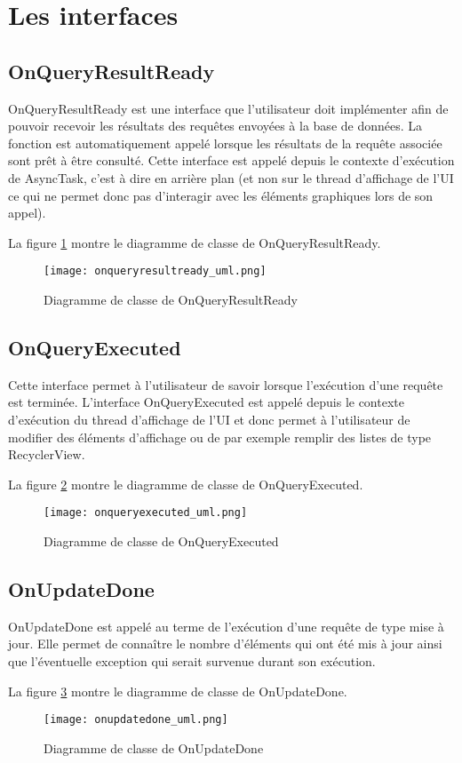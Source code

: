 \section{Les interfaces}

\subsection{OnQueryResultReady}

OnQueryResultReady est une interface que l'utilisateur doit implémenter afin de pouvoir recevoir les résultats des requêtes envoyées à la base de données. La fonction est automatiquement appelé lorsque les résultats de la requête associée sont prêt à être consulté. Cette interface est appelé depuis le contexte d'exécution de AsyncTask, c'est à dire en arrière plan (et non sur le thread d'affichage de l'UI ce qui ne permet donc pas d'interagir avec les éléments graphiques lors de son appel).

La figure \ref{fig:onqueryresultready_uml} montre le diagramme de classe de OnQueryResultReady.

\begin{figure}[htb]
\centering 
\texttt{[image: onqueryresultready\_uml.png]} 
\caption{Diagramme de classe de OnQueryResultReady}
\label{fig:onqueryresultready_uml}
 \end{figure}

\subsection{OnQueryExecuted}

Cette interface permet à l'utilisateur de savoir lorsque l'exécution d'une requête est terminée. L'interface OnQueryExecuted est appelé depuis le contexte d'exécution du thread d'affichage de l'UI et donc permet à l'utilisateur de modifier des éléments d'affichage ou de par exemple remplir des listes de type RecyclerView.

La figure \ref{fig:onqueryexecuted_uml} montre le diagramme de classe de OnQueryExecuted.

\begin{figure}[htb]
\centering 
\texttt{[image: onqueryexecuted\_uml.png]} 
\caption{Diagramme de classe de OnQueryExecuted}
\label{fig:onqueryexecuted_uml}
 \end{figure}

\subsection{OnUpdateDone}

OnUpdateDone est appelé au terme de l'exécution d'une requête de type mise à jour. Elle permet de connaître le nombre d'éléments qui ont été mis à jour ainsi que l'éventuelle exception qui serait survenue durant son exécution.

La figure \ref{fig:onupdatedone_uml} montre le diagramme de classe de OnUpdateDone.

\begin{figure}[htb]
\centering 
\texttt{[image: onupdatedone\_uml.png]} 
\caption{Diagramme de classe de OnUpdateDone}
\label{fig:onupdatedone_uml}
 \end{figure}
